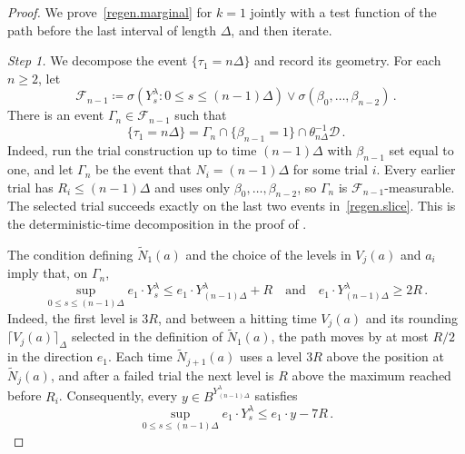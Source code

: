 \documentclass[11pt]{amsart}
\theoremstyle{definition}
\theoremstyle{remark}
\numberwithin{equation}{section}
\begin{document}
\begin{proof}
We prove~\eqref{regen.marginal} for $k=1$ jointly with a test function of the path before the last interval of length $\Delta$, and then iterate.

\emph{Step 1.} We decompose the event $\{\tau_1=n\Delta\}$ and record its geometry. For each $n\geq2$, let
\begin{equation*}
 \mathcal F_{n-1}\coloneqq
 \sigma(Y^\lambda_s:0\leq s\leq(n-1)\Delta)
 \vee\sigma(\beta_0,\ldots,\beta_{n-2})\, .
\end{equation*}
There is an event $\Gamma_n\in\mathcal F_{n-1}$ such that
\begin{equation}\label{regen.slice}
 \{\tau_1=n\Delta\}
 =\Gamma_n\cap\{\beta_{n-1}=1\}\cap\theta_{n\Delta}^{-1}\mathcal D\, .
\end{equation}
Indeed, run the trial construction up to time $(n-1)\Delta$ with $\beta_{n-1}$ set equal to one, and let $\Gamma_n$ be the event that $N_i=(n-1)\Delta$ for some trial $i$. Every earlier trial has $R_i\leq(n-1)\Delta$ and uses only $\beta_0,\ldots,\beta_{n-2}$, so $\Gamma_n$ is $\mathcal F_{n-1}$-measurable. The selected trial succeeds exactly on the last two events in~\eqref{regen.slice}. This is the deterministic-time decomposition in the proof of \citet[Theorem~2.4, display~(2.20)]{ballistic2003shen}.

The condition defining $\widetilde N_1(a)$ and the choice of the levels in $V_j(a)$ and $a_i$ imply that, on $\Gamma_n$,
\begin{equation}\label{regen.geometry}
 \sup_{0\leq s\leq(n-1)\Delta}e_1\cdot Y^\lambda_s
 \leq e_1\cdot Y^\lambda_{(n-1)\Delta}+R
 \quad\text{and}\quad e_1\cdot Y^\lambda_{(n-1)\Delta}\geq2R\, .
\end{equation}
Indeed, the first level is $3R$, and between a hitting time $V_j(a)$ and its rounding $\lceil V_j(a)\rceil_\Delta$ selected in the definition of $\widetilde N_1(a)$, the path moves by at most $R/2$ in the direction $e_1$. Each time $\widetilde N_{j+1}(a)$ uses a level $3R$ above the position at $\widetilde N_j(a)$, and after a failed trial the next level is $R$ above the maximum reached before $R_i$. Consequently, every $y\in B^{Y^\lambda_{(n-1)\Delta}}$ satisfies
\begin{equation}\label{regen.gap}
 \sup_{0\leq s\leq(n-1)\Delta}e_1\cdot Y^\lambda_s\leq e_1\cdot y-7R\, .
\end{equation}


\end{proof}
\end{document}
